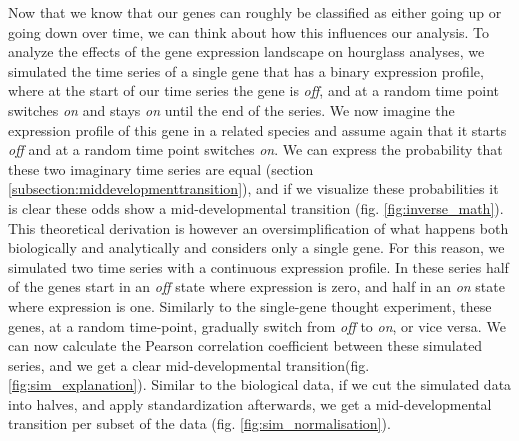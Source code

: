 Now that we know that our genes can roughly be classified as either going up or going down over time, we can think about how this influences our analysis. To analyze the effects of the gene expression landscape on hourglass analyses, we simulated the time series of a single gene that has a binary expression profile, where at the start of our time series the gene is \textit{off}, and at a random time point switches \textit{on} and stays \textit{on} until the end of the series. We now imagine the expression profile of this gene in a related species and assume again that it starts \textit{off} and at a random time point switches \textit{on}. We can express the probability that these two imaginary time series are equal (section \ref{subsection:middevelopmenttransition}), and if we visualize these probabilities it is clear these odds show a mid-developmental transition (fig. \ref{fig:inverse_math}). This theoretical derivation is however an oversimplification of what happens both biologically and analytically and considers only a single gene. For this reason, we simulated two time series with a continuous expression profile. In these series half of the genes start in an \textit{off} state where expression is zero, and half in an \textit{on} state where expression is one. Similarly to the single-gene thought experiment, these genes, at a random time-point, gradually switch from \textit{off} to \textit{on}, or vice versa. We can now calculate the Pearson correlation coefficient between these simulated series, and we get a clear mid-developmental transition(fig. \ref{fig:sim_explanation}). Similar to the biological data, if we cut the simulated data into halves, and apply standardization afterwards, we get a mid-developmental transition per subset of the data (fig. \ref{fig:sim_normalisation}). 

